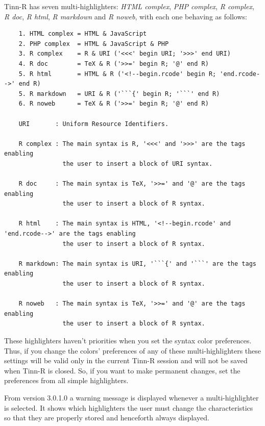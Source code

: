 Tinn-R has seven multi-highlighters: \textit{HTML complex}, \textit{PHP complex},
\textit{R complex}, \textit{R doc},  \textit{R html}, \textit{R markdown} and \textit{R noweb},
with each one behaving as follows:

\begin{footnotesize}
  \begin{verbatim}
    1. HTML complex = HTML & JavaScript
    2. PHP complex  = HTML & JavaScript & PHP
    3. R complex    = R & URI ('<<<' begin URI; '>>>' end URI)
    4. R doc        = TeX & R ('>>=' begin R; '@' end R)
    5. R html       = HTML & R ('<!--begin.rcode' begin R; 'end.rcode-->' end R)
    5. R markdown   = URI & R ('```{' begin R; '```' end R)
    6. R noweb      = TeX & R ('>>=' begin R; '@' end R)

    URI       : Uniform Resource Identifiers.

    R complex : The main syntax is R, '<<<' and '>>>' are the tags enabling
                the user to insert a block of URI syntax.

    R doc     : The main syntax is TeX, '>>=' and '@' are the tags enabling
                the user to insert a block of R syntax.

    R html    : The main syntax is HTML, '<!--begin.rcode' and 'end.rcode-->' are the tags enabling
                the user to insert a block of R syntax.

    R markdown: The main syntax is URI, '```{' and '```' are the tags enabling
                the user to insert a block of R syntax.

    R noweb   : The main syntax is TeX, '>>=' and '@' are the tags enabling
                the user to insert a block of R syntax.
  \end{verbatim}
\end{footnotesize}

These highlighters haven't priorities when you set the syntax color preferences.
Thus, if you change the colors' preferences of any of these multi-highlighters
these settings will be valid only in the current Tinn-R session and will not be
saved when Tinn-R is closed. So, if you want to make permanent changes, set the
preferences from all simple highlighters.

From version 3.0.1.0 a warning message is displayed whenever
a multi-highlighter is selected. It shows which highlighters the user
must change the characteristics so that they are properly stored and
henceforth always displayed.


\hypertarget{dlg_hotkeys_editor}{}
